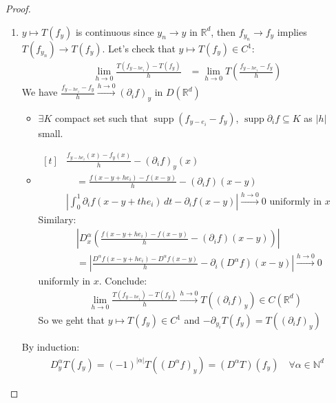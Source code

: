 \documentclass{report}
\theoremstyle{tommy}
\newcommand{\supp}{\operatorname{supp}}
\begin{document}
  \begin{proof}
    \begin{enumerate}[label=\alph*)]
      \item \(y \mapsto T(f_y)\) is continuous since \(y_n \to y\) in \(\mathbb{R}^d\), then 
      \(f_{y_n} \to f_y\) implies \(T(f_{y_n}) \to T(f_y)\). Let's check that \(y \mapsto T(f_y) \in C^1\):
      \begin{align*}
        \lim_{h \to 0} \frac{T(f_{y-he_i})-T(f_y)}{h}
        &= \lim_{h \to 0} T \left(\frac{f_{y-he_i} - f_y}{h}\right)
      \end{align*}
        We have \(\frac{f_{y - h e_i} - f_y}{h} \xrightarrow{h \to 0} (\partial_i f)_y\) in \(D(\mathbb{R}^d)\)
      \begin{itemize}
        \item \(\exists K\) compact set such that \(\supp(f_{y - e_i} - f_y)\), \(\supp \partial_i f \subseteq K\) as \(|h|\) small.
        \item \(\begin{aligned}[t]
          &\frac{f_{y - h e_i}(x)- f_y(x)}{h} - (\partial_i f)_y(x) \\
          &\quad = \frac{f(x-y+he_i) - f(x-y)}{h} - (\partial_i f)(x-y) \\
          &\left| \int_0^1 \partial_i f(x-y+the_i) \, dt - \partial_i f(x-y) \right| \xrightarrow{h \to 0} 0 \text{ uniformly in } x
        \end{aligned}\) \\
        Similary:
        \begin{align*}
          &\left| D_x^\alpha \left(\frac{f(x-y+he_i) - f(x-y)}{h} - (\partial_i f)(x-y)\right) \right| \\
          &= \left| \frac{D^\alpha f(x-y+he_i) - D^\alpha f(x-y)}{h} - \partial_i(D^\alpha f)(x-y) \right| \xrightarrow{h \to 0} 0 
        \end{align*}
        uniformly in \(x\). Conclude: 
        \begin{align*}
          \lim_{h \to 0} \frac{T(f_{y - he_i}) - T(f_y)}{h} \xrightarrow{h \to 0} T((\partial_i f)_y) \in C(\mathbb{R}^d)
        \end{align*}
        So we geht that \(y \mapsto T(f_y) \in C^1\) and \(- \partial_{y_i} T(f_y) = T((\partial_i f)_y)\)
      \end{itemize}
      By induction: 
      \begin{align*}
        D_y^\alpha T(f_y) = (-1)^{|\alpha|} T((D^\alpha f)_y) = (D^\alpha T)(f_y) \quad \forall \alpha \in \mathbb{N}^d

\end{align*}
\end{enumerate}
\end{proof}
\end{document}

